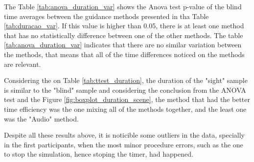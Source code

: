 The Table \ref{tab:anova_duration_var} shows the Anova test p-value of the blind time averages between the guidance methods presented in tha Table \ref{tab:duracao_var}. If this value is higher than 0.05, there is at least one method that has no statistically difference between one of the other methods. The table \ref{tab:anova_duration_var} indicates that there are no similar variation between the methods, that means that all of the time differences noticed on the methods are relevant.





%
%

Considering the on Table \ref{tab:ttest_duration}, the duration of the "sight" sample is similar to the "blind" sample and considering the conclusion from the ANOVA test and the Figure \ref{fig:boxplot_duration_scene}, the method that had the better time efficiency was the one mixing all of the methods together, and the least one was the "Audio" method.

Despite all these results above, it is noticible some outliers in the data, specially in the first participants, when the most minor procedure errors, such as the one to stop the simulation, hence stoping the timer, had happened.

